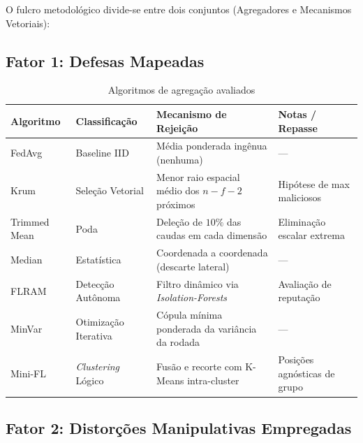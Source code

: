 O fulcro metodológico divide-se entre dois conjuntos (Agregadores e Mecanismos Vetoriais):

\subsection{Fator 1: Defesas Mapeadas}

\begin{table}[h]
\centering
\caption{Algoritmos de agregação avaliados}
\label{tab:agregadores}
\footnotesize
\setlength{\tabcolsep}{3pt}
\begin{tabular}{@{}llp{4cm}l@{}}
\toprule
\textbf{Algoritmo} & \textbf{Classificação} & \textbf{Mecanismo de Rejeição} & \textbf{Notas / Repasse} \\
\midrule
FedAvg & Baseline IID & Média ponderada ingênua (nenhuma) & --- \\
Krum \cite{Blanchard2017} & Seleção Vetorial & Menor raio espacial médio dos $n-f-2$ próximos & Hipótese de max maliciosos \\
Trimmed Mean \cite{Yin2018} & Poda & Deleção de $10\%$ das caudas em cada dimensão & Eliminação escalar extrema \\
Median \cite{Yin2018} & Estatística & Coordenada a coordenada (descarte lateral) & --- \\
FLRAM \cite{Chen2023} & Detecção Autônoma & Filtro dinâmico via \textit{Isolation-Forests} & Avaliação de reputação \\
MinVar \cite{Xu2024} & Otimização Iterativa & Cópula mínima ponderada da variância da rodada & --- \\
Mini-FL \cite{Li2023} & \textit{Clustering} Lógico & Fusão e recorte com K-Means intra-cluster & Posições agnósticas de grupo \\
\bottomrule
\end{tabular}
\end{table}

\subsection{Fator 2: Distorções Manipulativas Empregadas}

